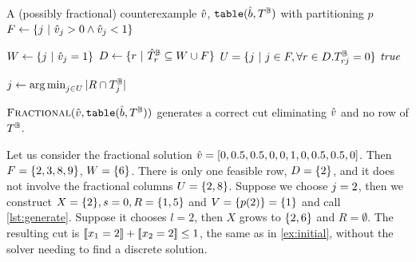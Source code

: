 \documentclass[a4paper,UKenglish,cleveref,autoref,thm-restate]{lipics-v2021}
\begin{document}
\begin{algorithm}
\caption{The \lazyFractional algorithm for Boolean table constraints}
\label{lst:frac}
\begin{algorithmic}[1]
    \Require A (possibly fractional) counterexample $\hat{v}$, $\texttt{table}(\hat{b},T^{\mathbb{B}})$ with partitioning $p$
    \Function{\lazyFractional}{\generateInitArgs}
    \State $F \gets \{j ~|~ \hat{v}_j > 0 \wedge \hat{v}_j < 1\}$
    \label{lst:frac:F}
        \State \Return \Call{\lazyGenerate}{\generateInitArgs}
    \EndIf
    
    \State $W \gets \{j ~|~ \hat{v}_j = 1\}$
    \State $D \gets \{r ~|~ \hat{T}^{\mathbb{B}}_r \subseteq W \cup F\}$ 
    \label{lst:frac:D}
    \State $U = \{j ~|~ j \in F, \forall r \in D.T^{\mathbb{B}}_{rj} = 0\}$
    \label{lst:frac:U}
        \State \Return $\mathit{true}$
    \EndIf
    
    \State $j \gets \operatorname*{arg\,min}_{j \in U} |R \cap T^{\mathbb{B}}_j|$
    \label{lst:frac:choose}
    \State \Return {}
    \EndFunction
\end{algorithmic}
\end{algorithm}


\begin{theorem}
\label{thm:valid}
   $\Call{\lazyFractional}{\generateInitArgs}$ generates a correct cut eliminating $\hat{v}$ and no row of $T^{\mathbb{B}}$.
\end{theorem}

\begin{example}
\label{ex:generate-frac}
    Let us consider the fractional solution 
    $\hat{v} = [0,0.5,0.5,0,0,1,0,0.5,0.5,0]$.
    Then $F = \{2,3,8,9\}$, $W = \{6\}$. There is only one feasible row, 
    $D = \{2\}$, and it does not involve the fractional columns $U = \{2,8\}$.
    Suppose we choose $j = 2$, then we 
    construct $X = \{2\}, s = 0, R = \{1,5\}$ and $V = \{p(2)\} = \{1\}$ and call \cref{lst:generate}. 
    Suppose it chooses $l = 2$, then $X$ grows to $\{2,6\}$
    and $R = \emptyset$.
    The resulting cut is $[\![x_{1} = 2]\!] + [\![x_{2} = 2]\!] \leq 1$, the same as in \cref{ex:initial}, without the solver needing to find a discrete solution.
\end{example}
\end{document}
